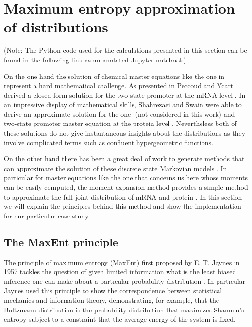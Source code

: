 \section{Maximum entropy approximation of distributions}\label{supp_maxent}

(Note: The Python code used for the calculations presented in this section can
be found in the
\href{https://www.rpgroup.caltech.edu//chann_cap/software/MaxEnt_approx_joint.html}{following
link} as an anotated Jupyter notebook)

On the one hand the solution of chemical master equations like the one in
 represent a hard mathematical challenge. As presented in
 Peccoud and Ycart derived a closed-form solution
for the two-state promoter at the mRNA level \cite{Peccoud1995}. In an
impressive display of mathematical skills, Shahrezaei and Swain were able to
derive an approximate solution for the one- (not considered in this work) and
two-state promoter master equation at the protein level \cite{Shahrezaei2008}.
Nevertheless both of these solutions do not give instantaneous insights about
the distributions as they involve complicated terms such as confluent
hypergeometric functions.

On the other hand there has been a great deal of work to generate methods that
can approximate the solution of these discrete state Markovian models
\cite{Ale2013, Andreychenko2017, Frohlich2016, Schnoerr2017, Smadbeck2013}. In
particular for master equations like the one that concerns us here whose
moments can be easily computed, the moment expansion method provides a simple
method to approximate the full joint distribution of mRNA and protein
\cite{Smadbeck2013}. In this section we will explain the principles behind this
method and show the implementation for our particular case study.

\subsection{The MaxEnt principle}

The principle of maximum entropy (MaxEnt) first proposed by E. T. Jaynes in
1957 tackles the question of given limited information what is the least biased
inference one can make about a particular probability distribution
\cite{Jaynes1957}. In particular Jaynes used this principle to show the
correspondence between statistical mechanics and information theory,
demonstrating, for example, that the Boltzmann distribution is the probability
distribution that maximizes Shannon's entropy subject to a constraint that the
average energy of the system is fixed.

